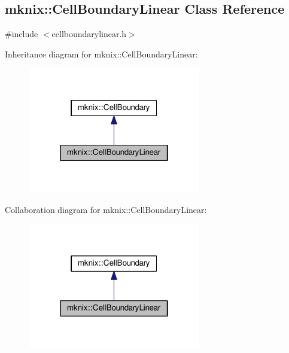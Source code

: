 \hypertarget{classmknix_1_1_cell_boundary_linear}{}\subsection{mknix\+:\+:Cell\+Boundary\+Linear Class Reference}
\label{classmknix_1_1_cell_boundary_linear}


{\ttfamily \#include $<$cellboundarylinear.\+h$>$}



Inheritance diagram for mknix\+:\+:Cell\+Boundary\+Linear\+:\nopagebreak
\begin{figure}[H]
\begin{center}
\leavevmode
\includegraphics[width=214pt]{df/d13/classmknix_1_1_cell_boundary_linear__inherit__graph}
\end{center}
\end{figure}


Collaboration diagram for mknix\+:\+:Cell\+Boundary\+Linear\+:\nopagebreak
\begin{figure}[H]
\begin{center}
\leavevmode
\includegraphics[width=214pt]{d8/d2b/classmknix_1_1_cell_boundary_linear__coll__graph}
\end{center}
\end{figure}
